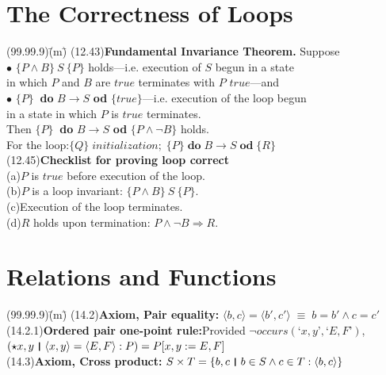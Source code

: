 \documentclass{amsart}
\newcommand{\lgap}{2pt}                             %
\newcommand{\llgap}{6pt}                            %
\newcommand{\equivs}{\ensuremath{\;\equiv\;}}       %
\newcommand{\impl}{\ensuremath{\Rightarrow}}        %
\newcommand{\thedr}{\rule[-.25ex]{.32mm}{1.75ex}}   %
\newcommand{\dr}{\;\,\thedr\,\;}                    %
\newcommand{\rb}{:}                                 %
\newcommand{\Lq}{\mbox{`}}
\newcommand{\Rq}{\mbox{'}}
\begin{document}
\newpage

\section*{The Correctness of Loops}
\begin{tabbing}
(99.99.9)\;\=(m)\;\=\kill
(12.43)\>\textbf{Fundamental Invariance Theorem.} \quad Suppose\\[\lgap]
            \>$\bullet$ \>$\{ P\land B \}\: S\: \{ P\}$ holds---i.e. execution of $S$ begun in a state\\[\lgap]
            \>\>in which $P$ and $B$ are $true$ terminates with $P$ $true$---and\\[\lgap]
            \>$\bullet$ \>$\{ P \}\:$ \textbf{do} $B\to S$ \textbf{od} $\{true\}$---i.e. execution of the loop begun\\[\lgap]
            \>\>in a state in which $P$ is $true$ terminates.\\[\lgap]
            \>Then $\{P\}\:$ \textbf{do} $B\to S$ \textbf{od} $\{P\land \neg B\}$ holds.\\[\llgap]
For the loop:\quad $\{Q\}\;initialization;\;\{P\}\;\textbf{do}\;B\to S\;\textbf{od}\;\{R\}$\\[\lgap]
(12.45)\>\textbf{Checklist for proving loop correct}\\[\lgap]
            \>(a)\>$P$ is $true$ before execution of the loop.\\[\lgap]
            \>(b)\>$P$ is a loop invariant: $\{P\land B\}\: S\: \{P\}$.\\[\lgap]
            \>(c)\>Execution of the loop terminates.\\[\lgap]
            \>(d)\>$R$ holds upon termination: $P\land \neg B\impl R$.\\[\lgap]
\end{tabbing}

\section*{Relations and Functions}
\begin{tabbing}
(99.99.9)\;\=(m)\;\=\kill
(14.2)\>\textbf{Axiom, Pair equality:} \quad $\langle b,c\rangle = \langle b' ,c' \rangle \equivs b=b' \land c=c'$\\[\lgap]
(14.2.1)\>\textbf{Ordered pair one-point rule:}\quad Provided $\neg occurs(\Lq x,y\Rq ,\Lq E,F\Rq)$,\\[\lgap]
        \>$(\star x,y\dr \langle x,y\rangle = \langle E,F \rangle \rb P) = P[x,y := E,F]$\\[\lgap]
(14.3)\>\textbf{Axiom, Cross product:} \quad $S\times T = \{b,c\dr b\in S\land c\in T\rb \langle b,c\rangle \}$\\[\lgap]
\end{tabbing}
\end{document}
